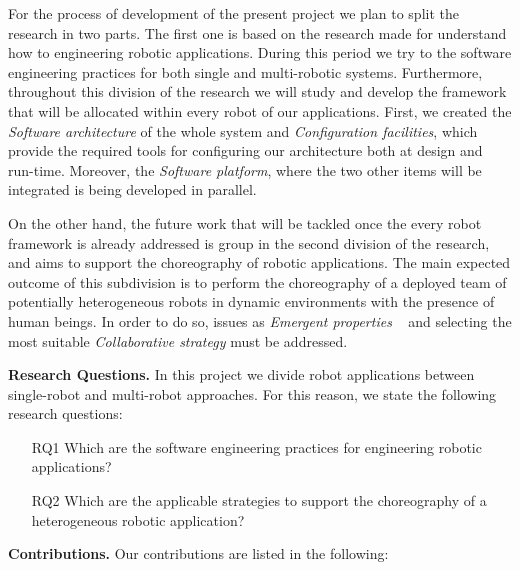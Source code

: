 For the process of development of the present project we plan to split the research in two parts.
The first one is based on the research made for understand how to engineering robotic applications.
During this period we try to the software engineering practices for both single and multi-robotic systems.
Furthermore, throughout this division of the research we will study and develop the framework that will be allocated within every robot of our applications.
First, we created the \emph{Software architecture} of the whole system and \emph{Configuration facilities}, which provide the required tools for configuring our architecture both at design and run-time.
Moreover, the \emph{Software platform}, where the two other items will be integrated is being developed in parallel.

On the other hand, the future work that will be tackled once the every robot framework is already addressed is group in the second division of the research, and aims to support the choreography of robotic applications.
The main expected outcome of this subdivision is to perform the choreography of a deployed team of potentially heterogeneous robots in dynamic environments with the presence of human beings.
In order to do so, issues as \emph{Emergent properties} ~\cite{DeAngelis2015,DeAngelis2016} and selecting the most suitable \emph{Collaborative strategy}  must be addressed.

\textbf{Research Questions.} 
In this project we divide robot applications between single-robot and multi-robot approaches.
For this reason, we state the following research questions:
\begin{itemize}
\item[RQ1] Which are the software engineering practices for engineering robotic applications? 
\item[RQ2] Which are the applicable strategies to support the choreography of a heterogeneous robotic application?
\end{itemize}

\textbf{Contributions.} 
Our contributions are listed in the following:

